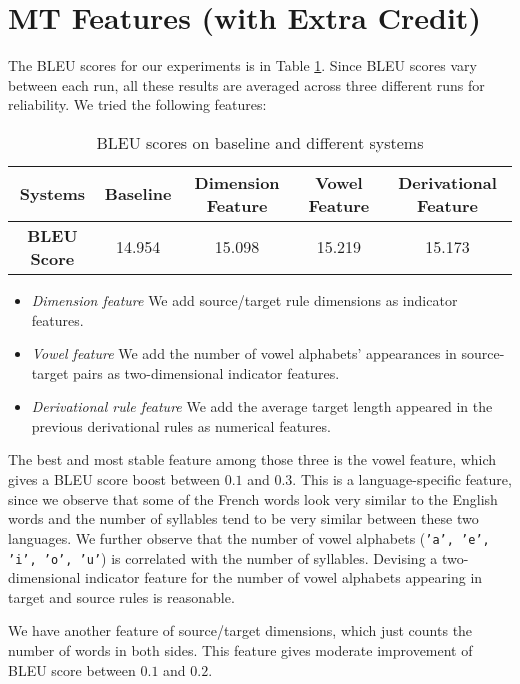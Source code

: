 \documentclass[letterpaper]{article}
\begin{document}
\section{MT Features (with Extra Credit)}
The BLEU scores for our experiments is in Table \ref{tab:bleu}. Since BLEU scores vary between each run, all these results are averaged across three different runs for reliability. We tried the following features:
\begin{table}
\begin{center}
\begin{tabular}{c|c|c|c|c}
\hline
\textbf{Systems} & Baseline & Dimension Feature & Vowel Feature & Derivational Feature \\
\hline
\textbf{BLEU Score} & 14.954 & 15.098 & 15.219 & 15.173 \\
\hline
\end{tabular}
\caption{BLEU scores on baseline and different systems}\label{tab:bleu}
\end{center}
\end{table}
\begin{itemize}
\item \textit{Dimension feature} We add source/target rule dimensions as indicator features. 
\item \textit{Vowel feature} We add the number of vowel alphabets' appearances in source-target pairs as two-dimensional indicator features.
\item \textit{Derivational rule feature} We add the average target length appeared in the previous derivational rules as numerical features.
\end{itemize}
The best and most stable feature among those three is the vowel feature, which gives a BLEU score boost between $0.1$ and $0.3$. This is a language-specific  feature, since we observe that some of the French words look very similar to the English words and the number of syllables tend to be very similar between these two languages.
We further observe that the number of vowel alphabets (\texttt{'a', 'e', 'i', 'o', 'u'}) is correlated with the number of syllables. Devising a two-dimensional indicator feature for the number of vowel alphabets appearing in target and source rules is reasonable.

\vspace{0.1cm}

We have another feature of source/target dimensions, which just counts the number of words in both sides. This feature gives moderate improvement of BLEU score between $0.1$ and $0.2$.
\end{document}
